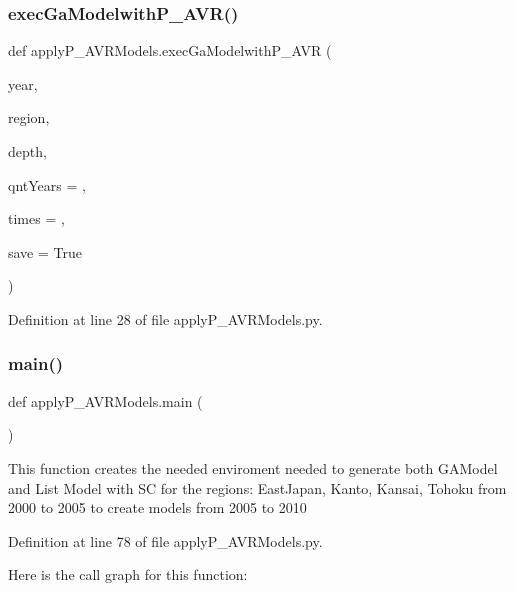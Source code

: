 \subsubsection{\texorpdfstring{exec\+Ga\+Modelwith\+P\+\_\+\+A\+V\+R()}{execGaModelwithP\_AVR()}}
{\footnotesize\ttfamily def apply\+P\+\_\+\+A\+V\+R\+Models.\+exec\+Ga\+Modelwith\+P\+\_\+\+A\+VR (\begin{DoxyParamCaption}\item[{}]{year,  }\item[{}]{region,  }\item[{}]{depth,  }\item[{}]{qnt\+Years = {},  }\item[{}]{times = {},  }\item[{}]{save = {\ttfamily True} }\end{DoxyParamCaption})}



Definition at line 28 of file apply\+P\+\_\+\+A\+V\+R\+Models.\+py.

\mbox{\label{namespaceapply_p___a_v_r_models_a964b6bb528b6482b871d880d9f8e9231}} 
\subsubsection{\texorpdfstring{main()}{main()}}
{\footnotesize\ttfamily def apply\+P\+\_\+\+A\+V\+R\+Models.\+main (\begin{DoxyParamCaption}{ }\end{DoxyParamCaption})}

\begin{DoxyVerb}This function creates the needed enviroment needed to generate both GAModel and List Model with SC
for the regions: EastJapan, Kanto, Kansai, Tohoku
from 2000 to 2005 to create models from 2005 to 2010
\end{DoxyVerb}
 

Definition at line 78 of file apply\+P\+\_\+\+A\+V\+R\+Models.\+py.

Here is the call graph for this function\+:
